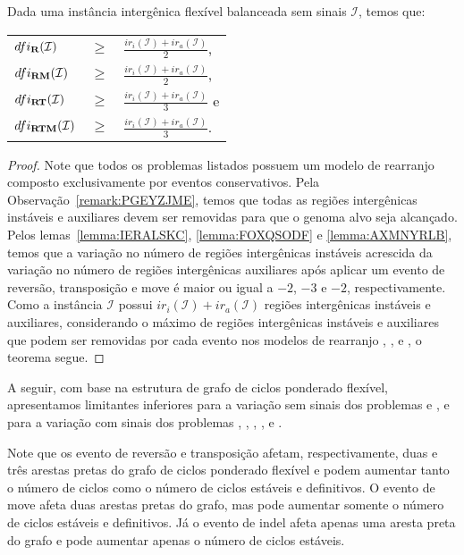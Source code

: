 \begin{theorem}\label{theorem:KKKUCDHN}
Dada uma instância intergênica flexível balanceada sem sinais $\mathcal{I}$, temos que:

\begin{tabular}{lll}
  $dfi_{\textbf{R}}(\mathcal{I})$      & $ \ge $ & $\frac{ir_i(\mathcal{I}) + ir_a(\mathcal{I})}{2}$,  \\ 
  $dfi_{\textbf{RM}}(\mathcal{I})$     & $ \ge $ & $\frac{ir_i(\mathcal{I}) + ir_a(\mathcal{I})}{2}$,  \\
  $dfi_{\textbf{RT}}(\mathcal{I})$     & $ \ge $ & $\frac{ir_i(\mathcal{I}) + ir_a(\mathcal{I})}{3}$ e \\
  $dfi_{\textbf{RTM}}(\mathcal{I})$    & $ \ge $ & $\frac{ir_i(\mathcal{I}) + ir_a(\mathcal{I})}{3}$.  \\
\end{tabular}
\end{theorem}
\begin{proof}
Note que todos os problemas listados possuem um modelo de rearranjo composto exclusivamente por eventos conservativos. Pela Observação~\ref{remark:PGEYZJME}, temos que todas as regiões intergênicas instáveis e auxiliares devem ser removidas para que o genoma alvo seja alcançado. Pelos lemas~\ref{lemma:IERALSKC}, \ref{lemma:FOXQSODF} e \ref{lemma:AXMNYRLB}, temos que a variação no número de regiões intergênicas instáveis acrescida da variação no número de regiões intergênicas auxiliares após aplicar um evento de reversão, transposição e move é maior ou igual a $-2$, $-3$ e $-2$, respectivamente. Como a instância $\mathcal{I}$ possui $ir_i(\mathcal{I}) + ir_a(\mathcal{I})$ regiões intergênicas instáveis e auxiliares, considerando o máximo de regiões intergênicas instáveis e auxiliares que podem ser removidas por cada evento nos modelos de rearranjo \R{}, \RM{}, \RT{} e \RTM{}, o teorema segue.
\end{proof}

A seguir, com base na estrutura de grafo de ciclos ponderado flexível, apresentamos limitantes inferiores para a variação sem sinais dos problemas \SbFIT{} e \SbFITM{}, e para a variação com sinais dos problemas \SbFIR{}, \SbFIRI{}, \SbFIRM{}, \SbFIRMI{}, \SbFIRT{} e \SbFIRTM{}.

Note que os evento de reversão e transposição afetam, respectivamente, duas e três arestas pretas do grafo de ciclos ponderado flexível e podem aumentar tanto o número de ciclos como o número de ciclos estáveis e definitivos. O evento de move afeta duas arestas pretas do grafo, mas pode aumentar somente o número de ciclos estáveis e definitivos. Já o evento de indel afeta apenas uma aresta preta do grafo e pode aumentar apenas o número de ciclos estáveis.

